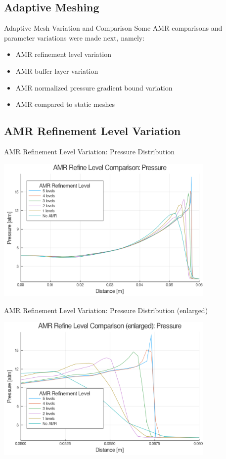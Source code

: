 \subsection{Adaptive Meshing}

\begin{frame}{Adaptive Mesh Variation and Comparison}
Some AMR comparisons and parameter variations were made next, namely:
\begin{itemize}
\item AMR refinement level variation
\item AMR buffer layer variation
\item AMR normalized pressure gradient bound variation 
\item AMR compared to static meshes
\end{itemize}
\end{frame}

\subsection{AMR Refinement Level Variation}


\begin{frame}{AMR Refinement Level Variation: Pressure Distribution}
\begin{center}
\includegraphics[width=0.8\textwidth]{../figs/amrfigs/amr_refinelevels/p.png}
\end{center}
\end{frame}

\begin{frame}{AMR Refinement Level Variation: Pressure Distribution (enlarged)}
\begin{center}
\includegraphics[width=0.8\textwidth]{../figs/amrfigs/amr_refinelevels/pe.png}
\end{center}
\end{frame}

